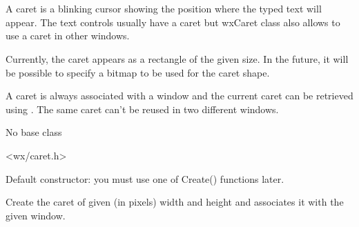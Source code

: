 
\section{}\label{wxcaret}

A caret is a blinking cursor showing the position where the typed text will
appear. The text controls usually have a caret but wxCaret class also allows
to use a caret in other windows.

Currently, the caret appears as a rectangle of the given size. In the future,
it will be possible to specify a bitmap to be used for the caret shape.

A caret is always associated with a window and the current caret can be
retrieved using . The same caret
can't be reused in two different windows.


No base class


<wx/caret.h>



\label{wxcaretwxcaret}


Default constructor: you must use one of Create() functions later.



Create the caret of given (in pixels) width and height and associates it
with the given window.

\label{wxcaretcreate}



